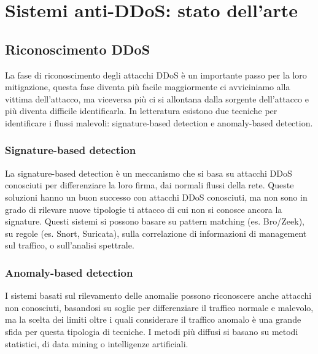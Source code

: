 
\chapter{Sistemi anti-DDoS: stato dell'arte}


\section{Riconoscimento DDoS}

La fase di riconoscimento degli attacchi DDoS è un importante passo per la loro mitigazione, questa fase diventa più facile maggiormente ci avviciniamo alla vittima dell'attacco, ma viceversa più ci si allontana dalla sorgente dell'attacco e più diventa difficile identificarla. In letteratura esistono due tecniche per identificare i flussi malevoli: signature-based detection e anomaly-based detection.

\subsection{Signature-based detection}

La signature-based detection è un meccanismo che si basa su attacchi DDoS conosciuti per differenziare la loro firma, dai normali flussi della rete. Queste soluzioni hanno un buon successo con attacchi DDoS conosciuti, ma non sono in grado di rilevare nuove tipologie ti attacco di cui non si conosce ancora la signature. Questi sistemi si possono basare su pattern matching (es. Bro/Zeek), su regole (es. Snort, Suricata), sulla correlazione di informazioni di management sul traffico, o sull'analisi spettrale.

\subsection{Anomaly-based detection}

I sistemi basati sul rilevamento delle anomalie possono riconoscere anche attacchi non conosciuti, basandosi su soglie per differenziare il traffico normale e malevolo, ma la scelta dei limiti oltre i quali considerare il traffico anomalo è una grande sfida per questa tipologia di tecniche.
I metodi più diffusi si basano su metodi statistici, di data mining o intelligenze artificiali.

